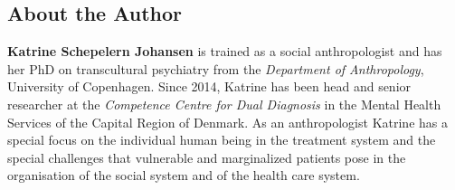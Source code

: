 \subsection{About the Author}
\label{paper6:colophon}

\textbf{Katrine Schepelern Johansen} is trained as a social anthropologist and has her PhD on transcultural psychiatry from the \textit{Department of Anthropology}, University of Copenhagen. Since 2014, Katrine has been head and senior researcher at the \textit{Competence Centre for Dual Diagnosis} in the Mental Health Services of the Capital Region of Denmark. As an anthropologist Katrine has a special focus on the individual human being in the treatment system and the special challenges that vulnerable and marginalized patients pose in the organisation of the social system and of the health care system.